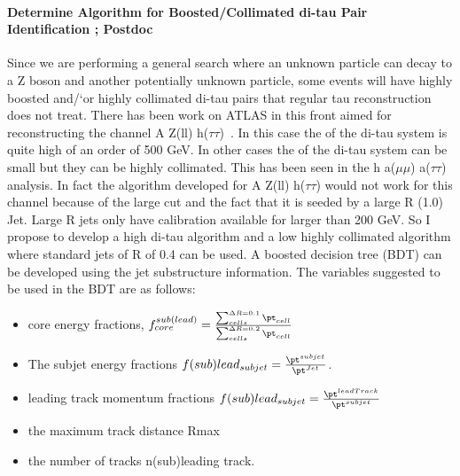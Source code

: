 \paragraph{Determine Algorithm for Boosted/Collimated di-tau Pair Identification ; Postdoc} %
Since we are performing a general search where an unknown particle can decay to a Z boson and another potentially unknown particle, some events will have highly boosted and/`or highly collimated di-tau pairs that regular
tau reconstruction does not treat.  There has been work on ATLAS in this front aimed for reconstructing the channel A \too Z(ll) h($\tau\tau$)~\cite{di-tau-thesis}.  In this case the \pt of the di-tau system is quite high of an order of 500 GeV.
In other cases the \pt of the di-tau system can be small but they can be highly collimated.  This has been seen in the h \too a($\mu \mu$) a($\tau \tau$) analysis.  In fact the algorithm developed for A \too Z(ll) h($\tau\tau$) would not 
work for this channel because of the large \pt cut and the fact that it is seeded by a large R (1.0) Jet.  Large R jets only have calibration available for \pt larger than 200 GeV.  So I propose to develop a high \pt di-tau
algorithm and a low \pt highly collimated algorithm where standard jets of R of 0.4 can be used. A boosted decision tree (BDT) can be developed using the jet substructure information.  
The variables suggested to be used in the BDT are as follows:
\begin{itemize}
\item{core energy fractions, $f_{core}^{sub(lead)}=\frac{\sum_{cells}^{\Delta R=0.1} \pt_{cell}}{\sum_{cells}^{\Delta R=0.2}\pt_{cell}} $}
\item {The subjet energy fractions $f(sub)lead_{subjet}=\frac{\pt^{subjet}}{\pt^{Jet}}$. }
\item{leading track momentum fractions $f(sub)lead_{subjet}=\frac{\pt ^{leadTrack}}{\pt^{subjet}}$}
\item{the maximum track distance Rmax}
\item{the number of tracks n(sub)leading track.}
\end{itemize}


